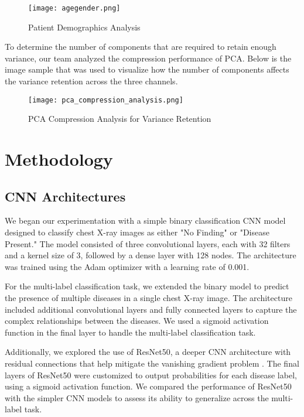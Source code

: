 \documentclass[conference]{IEEEtran}
\begin{document}
\begin{figure}[H]
    \centering
    \texttt{[image: agegender.png]}
    \caption{Patient Demographics Analysis}
    \label{fig:demographics}
\end{figure}

To determine the number of components that are required to retain enough variance, our team analyzed the compression performance of PCA. Below is the image sample that was used to visualize how the number of components affects the variance retention across the three channels.

\begin{figure}[H]
    \centering
    \texttt{[image: pca\_compression\_analysis.png]}
    \caption{PCA Compression Analysis for Variance Retention}
    \label{fig:pca_compression}
\end{figure}

\section{Methodology}

\subsection{CNN Architectures}
We began our experimentation with a simple binary classification CNN model designed to classify chest X-ray images as either "No Finding" or "Disease Present." The model consisted of three convolutional layers, each with 32 filters and a kernel size of 3, followed by a dense layer with 128 nodes. The architecture was trained using the Adam optimizer with a learning rate of 0.001.

For the multi-label classification task, we extended the binary model to predict the presence of multiple diseases in a single chest X-ray image. The architecture included additional convolutional layers and fully connected layers to capture the complex relationships between the diseases. We used a sigmoid activation function in the final layer to handle the multi-label classification task.

Additionally, we explored the use of ResNet50, a deeper CNN architecture with residual connections that help mitigate the vanishing gradient problem \cite{he2016deep}. The final layers of ResNet50 were customized to output probabilities for each disease label, using a sigmoid activation function. We compared the performance of ResNet50 with the simpler CNN models to assess its ability to generalize across the multi-label task.
\end{document}
